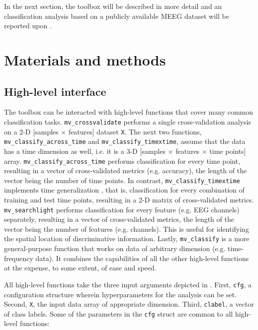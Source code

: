 \documentclass[utf8]{frontiersSCNS} %
\newcommand{\ttt}[1]{\texttt{#1}}
\begin{document}
In the next section, the toolbox will be described in more detail and an classification analysis based on a publicly available MEEG dataset will be reported upon \citep{Wakeman2015ADataset,Wakeman2014OpenfMRI}.

\section{Materials and methods}

\subsection{High-level interface}


The toolbox can be interacted with high-level functions that cover many common classification tasks. \ttt{mv\_crossvalidate} performs a single cross-validation analysis on a 2-D [samples $\times$ features] dataset \ttt{X}. The next two functions, \ttt{mv\_classify\_across\_time}  and \ttt{mv\_classify\_timextime}, assume that the data has a time dimension as well, i.e. it is a 3-D [samples $\times$ features $\times$ time points] array. \ttt{mv\_classify\_across\_time} performs classification for every time point, resulting in a vector of cross-validated metrics (e.g. accuracy), the length of the vector being the number of time points. In contrast, \ttt{mv\_classify\_timextime} implements time generalization \citep{King2014}, that is, classification for every combination of training and test time points, resulting in a 2-D matrix of cross-validated metrics. \ttt{mv\_searchlight}  performs classification for every feature (e.g. EEG channels) separately, resulting in a vector of cross-validated metrics, the length of the vector being the number of features (e.g. channels). This is useful for identifying the spatial location of discriminative information. Lastly, \ttt{mv\_classify} is a more general-purpose function that works on data of arbitrary dimension (e.g. time-frequency data). It combines the capabilities of all the other high-level functions at the expense, to some extent, of ease and speed.

All high-level functions take the three input arguments depicted in . First, \ttt{cfg}, a configuration structure wherein hyperparameters for the analysis can be set. Second, \ttt{X}, the input data array of appropriate dimension. Third, \ttt{clabel}, a vector of class labels.
Some of the parameters in the \ttt{cfg} struct are common  to all high-level functions:
\end{document}
